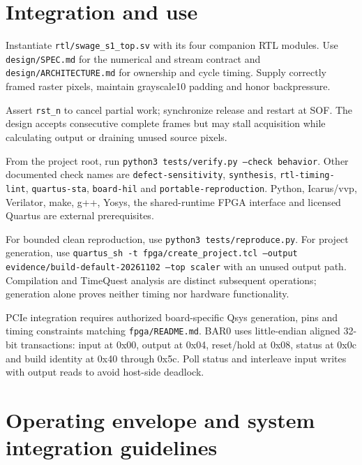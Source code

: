 \documentclass[11pt,a4paper]{article}
\begin{document}
\section{Integration and use}

Instantiate \texttt{rtl/\allowbreak{}swage\_\allowbreak{}s1\_\allowbreak{}top.sv} with its four companion RTL modules. Use \texttt{design/\allowbreak{}SPEC.md} for the numerical and stream contract and \texttt{design/\allowbreak{}ARCHITECTURE.md} for ownership and cycle timing. Supply correctly framed raster pixels,\allowbreak{} maintain grayscale10 padding and honor backpressure.


Assert \texttt{rst\_\allowbreak{}n} to cancel partial work; synchronize release and restart at SOF. The design accepts consecutive complete frames but may stall acquisition while calculating output or draining unused source pixels.


From the project root,\allowbreak{} run \texttt{python3 tests/\allowbreak{}verify.py --check behavior}. Other documented check names are \texttt{defect-sensitivity},\allowbreak{} \texttt{synthesis},\allowbreak{} \texttt{rtl-timing-lint},\allowbreak{} \texttt{quartus-sta},\allowbreak{} \texttt{board-hil} and \texttt{portable-reproduction}. Python,\allowbreak{} Icarus/\allowbreak{}vvp,\allowbreak{} Verilator,\allowbreak{} make,\allowbreak{} g+\allowbreak{}+\allowbreak{},\allowbreak{} Yosys,\allowbreak{} the shared-runtime FPGA interface and licensed Quartus are external prerequisites.


For bounded clean reproduction,\allowbreak{} use \texttt{python3 tests/\allowbreak{}reproduce.py}. For project generation,\allowbreak{} use \texttt{quartus\_\allowbreak{}sh -t fpga/\allowbreak{}create\_\allowbreak{}project.tcl --output evidence/\allowbreak{}build-default-20261102 --top scaler} with an unused output path. Compilation and TimeQuest analysis are distinct subsequent operations; generation alone proves neither timing nor hardware functionality.


PCIe integration requires authorized board-specific Qsys generation,\allowbreak{} pins and timing constraints matching \texttt{fpga/\allowbreak{}README.md}. BAR0 uses little-endian aligned 32-bit transactions: input at 0x00,\allowbreak{} output at 0x04,\allowbreak{} reset/\allowbreak{}hold at 0x08,\allowbreak{} status at 0x0c and build identity at 0x40 through 0x5c. Poll status and interleave input writes with output reads to avoid host-side deadlock.


\section{Operating envelope and system integration guidelines}
\end{document}
